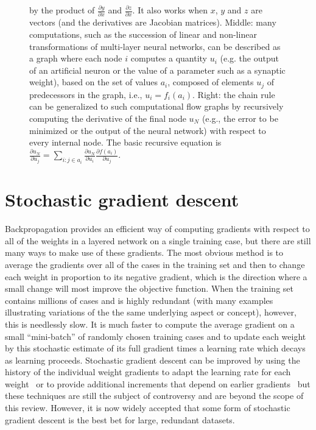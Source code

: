 \documentclass[]{article}
\begin{document}
\begin{figure}[H]
{\begin{minipage}{\textwidth}
{by the product of $\frac{\partial y}{\partial x}$ and
$\frac{\partial z}{\partial x}$. It also works when $x$, $y$
and $z$ are vectors (and the derivatives are Jacobian matrices). \newline
Middle: many computations, such as the succession of linear and non-linear 
transformations of multi-layer neural networks, can be described as
a graph where each node $i$ computes a quantity $u_i$ (e.g. the
output of an artificial neuron or the value of a parameter such as
a synaptic weight), based on the set of values $a_i$, composed of elements $u_j$ of
predecessors in the graph, i.e., $u_i = f_i(a_i)$. \newline
Right: the chain rule can be generalized to such computational
flow graphs by recursively computing the derivative of the final
node $u_N$ (e.g., the error to be minimized or the output of the neural network)
with respect to every internal node. The basic recursive equation
is
$\frac{\partial u_N}{\partial u_j} = \sum_{i: j \in a_i} \frac{\partial u_N}{\partial u_i}
\frac{\partial f(a_i)}{\partial u_j}.$
}
\end{minipage}
}
\label{fig:backprop-box}
\end{figure}


\section{Stochastic gradient descent}

Backpropagation provides an efficient way of computing gradients with respect to all of
the weights in a layered network on a single training case, but there are
still many ways to make use of these gradients. The most obvious method is
to average the gradients over all of the cases in the training set and then
to change each weight in proportion to its negative gradient, which is the
direction where a small change will most improve the objective function. 
When the training set contains millions of cases and is highly redundant
(with many examples illustrating variations of the the same underlying 
aspect or concept), however,
this is needlessly slow. It is much faster to compute the average gradient
on a small ``mini-batch'' of randomly chosen training cases and to update
each weight by this stochastic estimate of its full gradient times a
learning rate which decays as learning proceeds. Stochastic gradient
descent can be improved by using the history of the individual weight
gradients to adapt the learning rate for each weight~\citep{bottou-bousquet-2008-small}
or to provide additional increments that depend on earlier gradients~\citep{momentum}
but these techniques are still the subject of controversy and are beyond
the scope of this review.  However, it is now widely accepted that some
form of stochastic gradient descent is the best bet for large, redundant
datasets.
\end{document}
